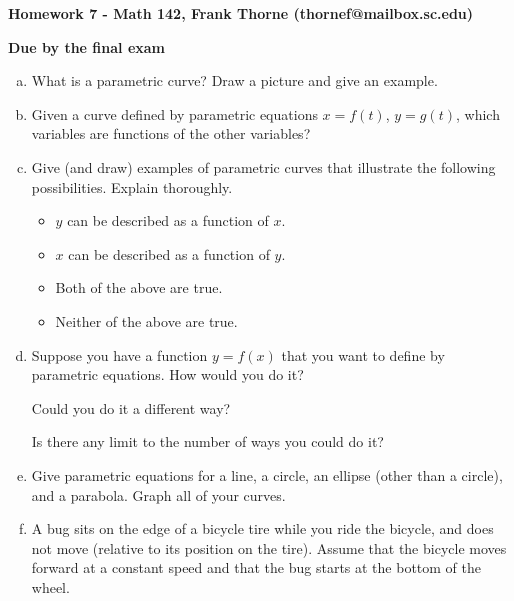 \documentclass[12pt]{article}
\begin{document}
\setlength{\topmargin}{-2mm}





\begin{center}{\bf Homework 7 - Math 142, Frank Thorne (thornef@mailbox.sc.edu)}
\end{center}
\begin{center}
{\bf Due by the final exam}
\end{center}

\begin{enumerate}[(a)]

\item
What is a parametric curve? Draw a picture and give an example.

\item
Given a curve defined by parametric equations $x = f(t)$, $y = g(t)$, 
which variables are functions of the other variables?

\item
Give (and draw) examples of parametric curves that illustrate the following possibilities.
Explain thoroughly.

\begin{itemize}
\item
$y$ can be described as a function of $x$.
\item
$x$ can be described as a function of $y$.
\item
Both of the above are true.
\item
Neither of the above are true.
\end{itemize}

\item
Suppose you have a function $y = f(x)$ that you want to define by parametric
equations. How would you do it?

Could you do it a different way?

Is there any limit to the number of ways you could do it?
\item
Give parametric equations for a line, a circle, an ellipse (other than a circle), and a
parabola. Graph all of your curves.

\item
A bug sits on the edge of a bicycle tire while you ride the bicycle, and does not move
(relative to its position on the tire). Assume that the bicycle moves forward at a constant
speed and that the bug starts at the bottom of the wheel.


\end{enumerate}
\end{document}
